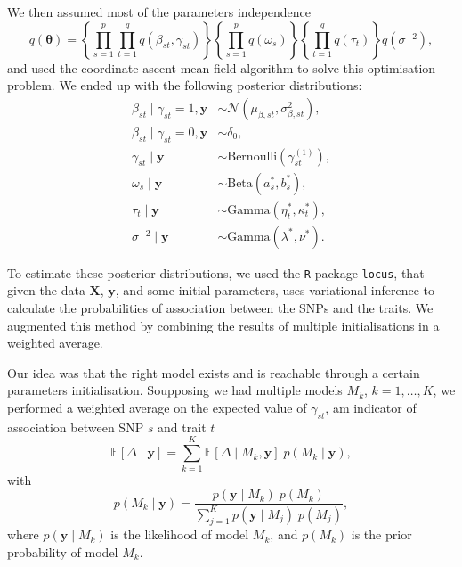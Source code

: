 \documentclass[a4paper, 11pt]{report}
\numberwithin{equation}{chapter}
\begin{document}
We then assumed most of the parameters independence
$$
q(\boldsymbol{\theta}) =\left\lbrace\prod_{s=1}^p \prod_{t=1}^q q(\beta_{st}, \gamma_{st})\right\rbrace \left\lbrace\prod_{s=1}^p  q(\omega_s)\right\rbrace \left\lbrace\prod_{t=1}^q q(\tau_t)\right\rbrace q(\sigma^{-2}),
$$
and used the coordinate ascent mean-field algorithm to solve this optimisation problem. We ended up with the following posterior distributions:
\begin{align*}
\beta_{st} \mid \gamma_{st} = 1, \boldsymbol{y} &\sim \mathcal{N}\left(\mu_{\beta, st},\sigma^2_{\beta, st}\right),\\
\beta_{st} \mid \gamma_{st} = 0, \boldsymbol{y} &\sim \delta_0,\\
\gamma_{st} \mid \boldsymbol{y} &\sim \text{Bernoulli}(\gamma_{st}^{(1)}),\\
\omega_s\mid\boldsymbol{y} &\sim \text{Beta}(a_s^*,b_s^*),\\
\tau_t\mid \boldsymbol{y} &\sim \text{Gamma}(\eta^*_t, \kappa^*_t),\\
\sigma^{-2} \mid \boldsymbol{y} &\sim \text{Gamma}(\lambda^*, \nu^*).
\end{align*}

To estimate these posterior distributions, we used the \texttt{R}-package \texttt{locus}, that given the data $\boldsymbol{X}$, $\boldsymbol{y}$, and some initial parameters, uses variational inference to calculate the probabilities of association between the SNPs and the traits. We augmented this method by combining the results of multiple initialisations in a weighted average.

Our idea was that the right model exists and is reachable through a certain parameters initialisation. Soupposing we had multiple models $M_k$, $k=1, \dots, K$, we performed a weighted average on the expected value of $\gamma_{st}$, am indicator of association between SNP $s$ and trait $t$
$$
\mathbb{E}\left[\Delta \mid \boldsymbol{y}\right] = \sum_{k=1}^K\mathbb{E}\left[\Delta \mid M_k, \boldsymbol{y}\right]\;p(M_k \mid \boldsymbol{y}),
$$
with 
$$
p(M_k \mid \boldsymbol{y}) = \frac{p(\boldsymbol{y} \mid M_k)\; p(M_k)}{\sum_{j=1}^K p(\boldsymbol{y} \mid M_j)\; p(M_j)},
$$
where $p(\boldsymbol{y}\mid M_k)$ is the likelihood of model $M_k$, and $p(M_k)$ is the prior probability of model $M_k$.
\end{document}
